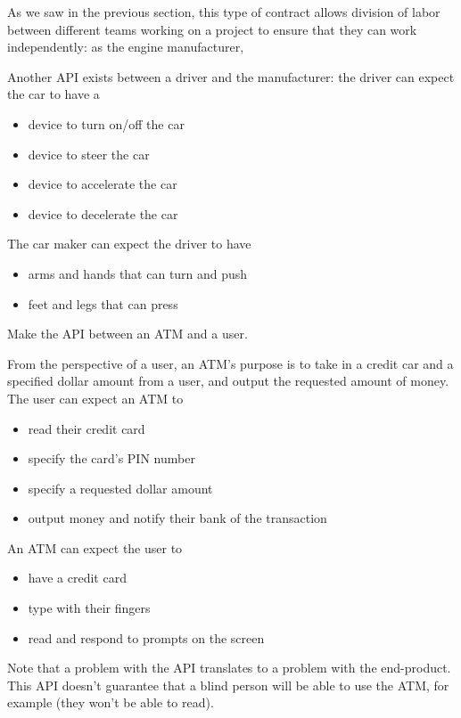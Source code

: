 As we saw in the previous section, this type of contract allows division of labor between different teams working on a project to ensure that they can work independently: as the engine manufacturer, 

Another API exists between a driver and the manufacturer: the driver can expect the car to have a 
\begin{itemize}
	\item device to turn on/off the car
	\item device to steer the car
	\item device to accelerate the car
	\item  device to decelerate the car
\end{itemize}

The car maker can expect the driver to have
\begin{itemize}
	\item arms and hands that can turn and push 
	\item feet and legs that can press 
\end{itemize}

\begin{example}
Make the API between an ATM and a user. 
\end{example}

From the perspective of a user, an ATM's purpose is to take in a credit car and a specified dollar amount from a user, and output the requested amount of money. The user can expect an ATM to
\begin{itemize}
	\item read their credit card
	\item specify the card's PIN number
	\item specify a requested dollar amount
	\item output money and notify their bank of the transaction
\end{itemize}

An ATM can expect the user to
\begin{itemize}
	\item have a credit card
	\item type with their fingers
	\item read and respond to prompts on the screen
\end{itemize}

Note that a problem with the API translates to a problem with the end-product. This API doesn't guarantee that a blind person will be able to use the ATM, for example (they won't be able to read). 

